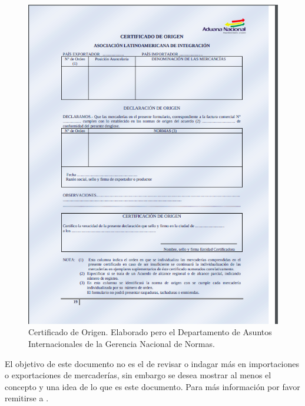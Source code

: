 \begin{figure}
  \centering
    \includegraphics[scale=0.7]{./Capitulo2/figs/documento_origen.png}
  \caption{Certificado de Origen. Elaborado pero el Departamento de Asuntos Internacionales de la Gerencia Nacional de Normas.}
  \label{documento_origen}
\end{figure}

El objetivo de este documento no es el de revisar o indagar más en importaciones o exportaciones de mercaderías, sin embargo se desea mostrar al menos el concepto y una idea de lo que es este documento. Para más información por favor remitirse a \citep{MAOB:2020:Online}.
